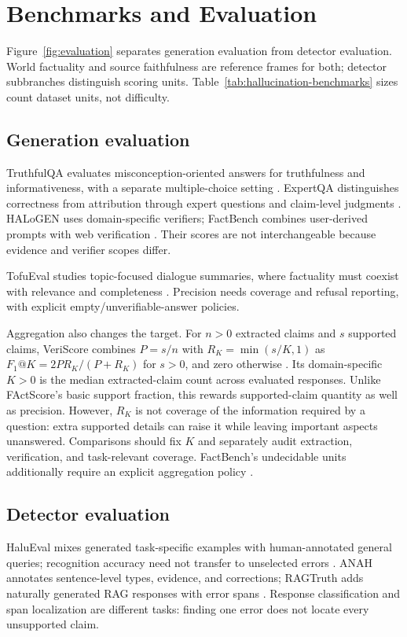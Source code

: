 \section{Benchmarks and Evaluation}\label{sec:evaluation}

Figure~\ref{fig:evaluation} separates generation evaluation from detector evaluation. World factuality and source faithfulness are reference frames for both; detector subbranches distinguish scoring units. Table~\ref{tab:hallucination-benchmarks} sizes count dataset units, not difficulty.

\subsection{Generation evaluation}
TruthfulQA evaluates misconception-oriented answers for truthfulness and informativeness, with a separate multiple-choice setting \citep{lin-etal-2022-truthfulqa}. ExpertQA distinguishes correctness from attribution through expert questions and claim-level judgments \citep{malaviya-etal-2024-expertqa}. HALoGEN uses domain-specific verifiers; FactBench combines user-derived prompts with web verification \citep{ravichander-etal-2025-halogen,fatahi-bayat-etal-2025-factbench}. Their scores are not interchangeable because evidence and verifier scopes differ.

TofuEval studies topic-focused dialogue summaries, where factuality must coexist with relevance and completeness \citep{tang-etal-2024-tofueval}. Precision needs coverage and refusal reporting, with explicit empty/unverifiable-answer policies.


Aggregation also changes the target. For $n>0$ extracted claims and $s$ supported claims, VeriScore combines $P=s/n$ with $R_K=\min(s/K,1)$ as $F_1@K=2PR_K/(P+R_K)$ for $s>0$, and zero otherwise \citep{song-etal-2024-veriscore}. Its domain-specific $K>0$ is the median extracted-claim count across evaluated responses. Unlike FActScore's basic support fraction, this rewards supported-claim quantity as well as precision. However, $R_K$ is not coverage of the information required by a question: extra supported details can raise it while leaving important aspects unanswered. Comparisons should fix $K$ and separately audit extraction, verification, and task-relevant coverage. FactBench's undecidable units additionally require an explicit aggregation policy \citep{fatahi-bayat-etal-2025-factbench}.

\subsection{Detector evaluation}
HaluEval mixes generated task-specific examples with human-annotated general queries; recognition accuracy need not transfer to unselected errors \citep{li-etal-2023-halueval}. ANAH annotates sentence-level types, evidence, and corrections; RAGTruth adds naturally generated RAG responses with error spans \citep{ji-etal-2024-anah,niu-etal-2024-ragtruth}. Response classification and span localization are different tasks: finding one error does not locate every unsupported claim.


